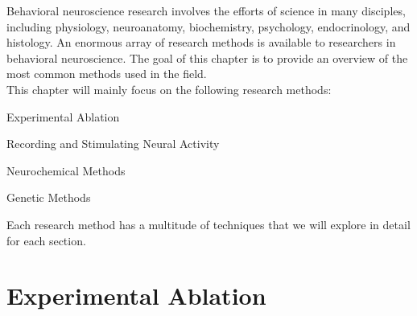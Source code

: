 Behavioral neuroscience research involves the efforts of science in many disciples, including physiology, neuroanatomy, biochemistry, psychology, endocrinology, and histology. An enormous array of research methods is available to researchers in behavioral neuroscience. The goal of this chapter is to provide an overview of the most common methods used in the field. \\

This chapter will mainly focus on the following research methods:
\begin{coloredlist}
    \item Experimental Ablation
    \item Recording and Stimulating Neural Activity
    \item Neurochemical Methods
    \item Genetic Methods
\end{coloredlist}
Each research method has a multitude of techniques that we will explore in detail for each section.

\section{Experimental Ablation}

